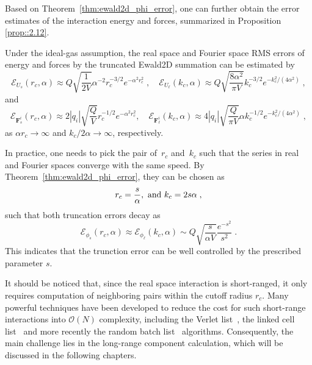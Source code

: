 Based on Theorem~\ref{thm:ewald2d_phi_error}, one can further obtain the error estimates of the interaction energy and forces, summarized in Proposition \ref{prop::2.12}.

\begin{prop}\label{prop::2.12}
	Under the ideal-gas assumption, the real space and Fourier space RMS errors of energy and forces by the truncated Ewald2D summation can be estimated by
	\begin{equation}\label{thm:ewald2d_error}
		\mathscr{E}_{U_s} (r_c, \alpha) \approx Q \sqrt{\frac{1}{2 V}} \alpha^{-2} r_c^{-3/2} e^{-\alpha^2r_c^2}\;,\quad
		\mathscr{E}_{U_{\ell}} (k_c, \alpha) \approx Q \sqrt{\frac{8 \alpha^2}{\pi V}} k_c^{-3/2} e^{- k_c^2/(4 \alpha^2)}\;,
	\end{equation}
	and
	\begin{equation}
		\mathscr{E}_{\bm{F}_{s}^i} (r_c, \alpha)\approx 2|q_{i}|\sqrt{\frac{Q}{V}}r_c^{-1/2}e^{-\alpha^2 r_c^2},\quad \mathscr{E}_{\bm{F}_{\ell}^i} (k_c, \alpha)\approx 4|q_{i}|\sqrt{\frac{Q}{\pi V}}\alpha k_c^{-1/2}e^{-k_c^2/(4\alpha^2)}\;,
	\end{equation}
	as $\alpha r_c\rightarrow\infty$ and $k_c/2\alpha\rightarrow\infty$, respectively.
\end{prop}

\begin{rmk}
	In practice, one needs to pick the pair of~$r_c$ and~$k_c$
	such that the series in real and Fourier spaces converge with the same speed.
	By Theorem~\ref{thm:ewald2d_phi_error}, they can be chosen as
	\begin{equation}\label{eq::rckc}
		r_c = \frac{s}{\alpha},~\hbox{and}~k_c = 2 s \alpha\;,
	\end{equation}
	such that both truncation errors decay as 
	\begin{equation}\label{eq:trunction_error}
		\mathscr{E}_{\phi_s}(r_c, \alpha)\approx \mathscr{E}_{\phi_\ell}(k_c, \alpha) \sim Q 
		\sqrt{\frac{s}{\alpha V}} \frac{e^{-s^2}}{s^2}\;.
	\end{equation}
	This indicates that the trunction error can be well controlled by the prescribed parameter $s$. 
\end{rmk}

It should be noticed that, since the real space interaction is short-ranged, it only requires computation of neighboring pairs within the cutoff radius $r_c$. 
Many powerful techniques have been developed to reduce the cost for such short-range interactions into $\mathcal O(N)$ complexity, including the Verlet list~\cite{verlet1967computer}, the linked cell list~\cite{allen2017computer} and more recently the random batch list~\cite{liang2021random} algorithms. 
Consequently, the main challenge lies in the long-range component calculation, which will be discussed in the following chapters.


